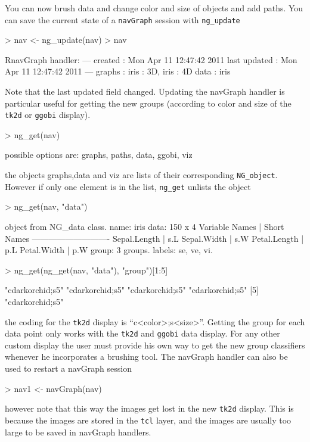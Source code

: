 \documentclass[12pt,oneside,titlepage,letter]{article}
\begin{document}
You can now brush data and change color and size of objects and add paths. You can save the current state of a \texttt{navGraph} session with \texttt{ng\_update}
\begin{Schunk}
\begin{Sinput}
> nav <- ng_update(nav)
> nav
\end{Sinput}
\begin{Soutput}
RnavGraph handler:
---
created       : Mon Apr 11 12:47:42 2011 
last updated  : Mon Apr 11 12:47:42 2011 
---
graphs        : iris : 3D, iris : 4D 
data          : iris 
\end{Soutput}
\end{Schunk}
Note that the last updated field changed. Updating the navGraph handler is particular useful for getting the new groups (according to color and size of the \texttt{tk2d} or \texttt{ggobi} display).
\begin{Schunk}
\begin{Sinput}
> ng_get(nav)
\end{Sinput}
\begin{Soutput}
possible options are: graphs, paths, data, ggobi, viz
\end{Soutput}
\end{Schunk}
the objects graphs,data and viz are lists of their corresponding \texttt{NG\_object}. However if only one element is in the list, \texttt{ng\_get} unlists the object
\begin{Schunk}
\begin{Sinput}
> ng_get(nav, "data")
\end{Sinput}
\begin{Soutput}
object from NG_data class.
  name: iris 
  data: 150 x 4 
    Variable Names | Short Names
    ----------------------------
    Sepal.Length   | s.L
    Sepal.Width    | s.W
    Petal.Length   | p.L
    Petal.Width    | p.W
  group:  3 groups.
  labels: se, ve, vi. 
\end{Soutput}
\begin{Sinput}
> ng_get(ng_get(nav, "data"), "group")[1:5]
\end{Sinput}
\begin{Soutput}
[1] "cdarkorchid;s5" "cdarkorchid;s5" "cdarkorchid;s5" "cdarkorchid;s5"
[5] "cdarkorchid;s5"
\end{Soutput}
\end{Schunk}
the coding for the \texttt{tk2d} display is ``c<color>;s<size>''. Getting the group for each data point only works with the \texttt{tk2d} and \texttt{ggobi} data display. For any other custom display the user must provide his own way to get the new group classifiers whenever he incorporates a brushing tool. The navGraph handler can also be used to restart a navGraph session
\begin{Schunk}
\begin{Sinput}
> nav1 <- navGraph(nav)
\end{Sinput}
\end{Schunk}
however note that this way the images get lost in the new \texttt{tk2d} display. This is because the images are stored in the \texttt{tcl} layer, and the images are usually too large to be saved in navGraph handlers.\\
\end{document}

